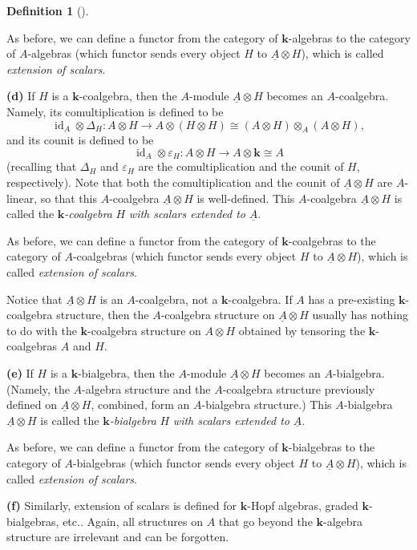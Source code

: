 \documentclass
[numbers=enddot,12pt,final,onecolumn,notitlepage,abstracton]{scrartcl}%
\theoremstyle{definition}
\newtheorem{defi}[theo]{Definition}
\newenvironment{definition}[1][]
{\begin{defi}[#1]\begin{leftbar}}
{\end{leftbar}\end{defi}}
\begin{document}
\begin{definition}
As before, we can define a functor from the category of $\mathbf{k}$-algebras
to the category of $A$-algebras (which functor sends every object $H$ to
$\underline{A}\otimes H$), which is called \textit{extension of scalars}.

\textbf{(d)} If $H$ is a $\mathbf{k}$-coalgebra, then the $A$-module
$\underline{A}\otimes H$ becomes an $A$-coalgebra. Namely, its
comultiplication is defined to be%
\[
\operatorname*{id}\nolimits_{A}\otimes\Delta_{H}:A\otimes H\rightarrow
A\otimes\left(  H\otimes H\right)  \cong\left(  A\otimes H\right)  \otimes
_{A}\left(  A\otimes H\right)  ,
\]
and its counit is defined to be%
\[
\operatorname*{id}\nolimits_{A}\otimes\varepsilon_{H}:A\otimes H\rightarrow
A\otimes\mathbf{k}\cong A
\]
(recalling that $\Delta_{H}$ and $\varepsilon_{H}$ are the comultiplication
and the counit of $H$, respectively). Note that both the comultiplication and
the counit of $\underline{A}\otimes H$ are $A$-linear, so that this
$A$-coalgebra $\underline{A}\otimes H$ is well-defined. This $A$-coalgebra
$\underline{A}\otimes H$ is called the $\mathbf{k}$\textit{-coalgebra }%
$H$\textit{ with scalars extended to }$\underline{A}$.

As before, we can define a functor from the category of $\mathbf{k}%
$-coalgebras to the category of $A$-coalgebras (which functor sends every
object $H$ to $\underline{A}\otimes H$), which is called \textit{extension of
scalars}.

Notice that $\underline{A}\otimes H$ is an $A$-coalgebra, not a $\mathbf{k}%
$-coalgebra. If $A$ has a pre-existing $\mathbf{k}$-coalgebra structure, then
the $A$-coalgebra structure on $\underline{A}\otimes H$ usually has nothing to
do with the $\mathbf{k}$-coalgebra structure on $A\otimes H$ obtained by
tensoring the $\mathbf{k}$-coalgebras $A$ and $H$.

\textbf{(e)} If $H$ is a $\mathbf{k}$-bialgebra, then the $A$-module
$\underline{A}\otimes H$ becomes an $A$-bialgebra. (Namely, the $A$-algebra
structure and the $A$-coalgebra structure previously defined on $\underline{A}%
\otimes H$, combined, form an $A$-bialgebra structure.) This $A$-bialgebra
$\underline{A}\otimes H$ is called the $\mathbf{k}$\textit{-bialgebra }%
$H$\textit{ with scalars extended to }$\underline{A}$.

As before, we can define a functor from the category of $\mathbf{k}%
$-bialgebras to the category of $A$-bialgebras (which functor sends every
object $H$ to $\underline{A}\otimes H$), which is called \textit{extension of
scalars}.

\textbf{(f)} Similarly, extension of scalars is defined for $\mathbf{k}$-Hopf
algebras, graded $\mathbf{k}$-bialgebras, etc.. Again, all structures on $A$
that go beyond the $\mathbf{k}$-algebra structure are irrelevant and can be forgotten.
\end{definition}
\end{document}
